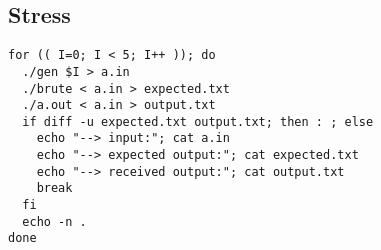 \documentclass[12pt, a4paper, twoside]{article}
\begin{document}
\subsection{Stress}
\begin{lstlisting}
for (( I=0; I < 5; I++ )); do
  ./gen $I > a.in
  ./brute < a.in > expected.txt
  ./a.out < a.in > output.txt
  if diff -u expected.txt output.txt; then : ; else
    echo "--> input:"; cat a.in
    echo "--> expected output:"; cat expected.txt
    echo "--> received output:"; cat output.txt
    break
  fi
  echo -n .
done
\end{lstlisting}

\pagebreak
\end{document}
